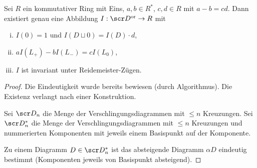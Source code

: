 \begin{st}[HOMPFLYPT]
    Sei $R$ ein kommutativer Ring mit Eins, $a, b \in R^*$, $c, d \in R$ mit $a - b = cd$.
    Dann existiert genau eine Abbildung $I: \scr D^{\text{or}} \to R$ mit
    \begin{enumerate}[i)]
        \item
            $I(0) = 1$ und $I(D \sqcup 0) = I(D) \cdot d$,
        \item
            $aI(L_+) - bI(L_-) = cI(L_0)$,
        \item
            $I$ ist invariant unter Reidemeister-Zügen.
    \end{enumerate}
    \begin{proof}
        Die Eindeutigkeit wurde bereits bewiesen (durch Algorithmus).
        Die Existenz verlangt nach einer Konstruktion.

        Sei $\scr D_n$ die Menge der Verschlingungsdiagrammen mit $\le n$ Kreuzungen.
        Sei $\scr D_n^*$ die Menge der Verschlingungsdiagrammen mit $\le n$ Kreuzungen und nummerierten Komponenten mit jeweils einem Basispunkt auf der Komponente.

        Zu einem Diagramm $D \in \scr D_n^*$ ist das absteigende Diagramm $\alpha D$ eindeutig bestimmt (Komponenten jeweils von Basispunkt absteigend).


\end{proof}
\end{st}
